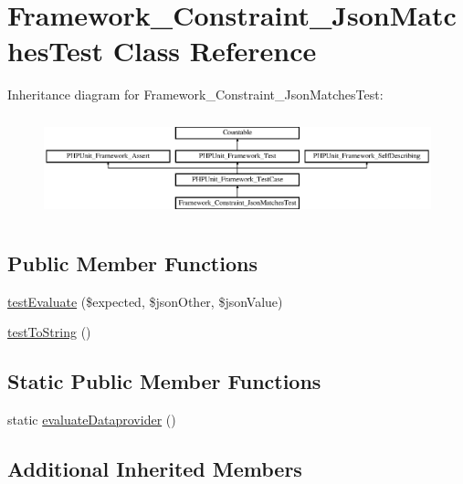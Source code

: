 \hypertarget{class_framework___constraint___json_matches_test}{}\section{Framework\+\_\+\+Constraint\+\_\+\+Json\+Matches\+Test Class Reference}
\label{class_framework___constraint___json_matches_test}
Inheritance diagram for Framework\+\_\+\+Constraint\+\_\+\+Json\+Matches\+Test\+:\begin{figure}[H]
\begin{center}
\leavevmode
\includegraphics[height=2.962963cm]{class_framework___constraint___json_matches_test}
\end{center}
\end{figure}
\subsection*{Public Member Functions}
\begin{DoxyCompactItemize}
\item 
\mbox{\hyperlink{class_framework___constraint___json_matches_test_a01847a293971dfb3f5bff85a8672f40d}{test\+Evaluate}} (\$expected, \$json\+Other, \$json\+Value)
\item 
\mbox{\hyperlink{class_framework___constraint___json_matches_test_ad0c45cf7077d1d6d8627e47de00e0374}{test\+To\+String}} ()
\end{DoxyCompactItemize}
\subsection*{Static Public Member Functions}
\begin{DoxyCompactItemize}
\item 
static \mbox{\hyperlink{class_framework___constraint___json_matches_test_ab3d260f7a1c6e117983fc714119e7271}{evaluate\+Dataprovider}} ()
\end{DoxyCompactItemize}
\subsection*{Additional Inherited Members}


